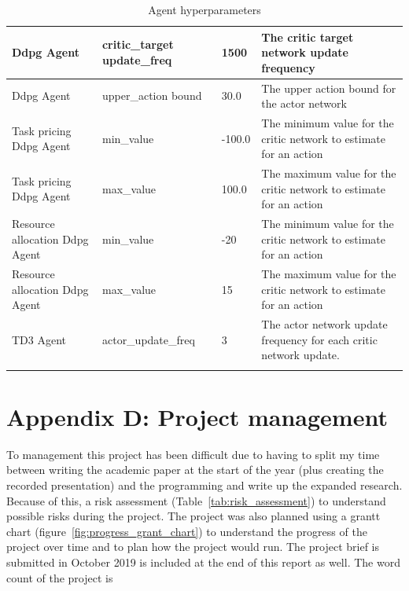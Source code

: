 \begin{longtable}{|p{2cm}|p{3.5cm}|p{2.5cm}|p{6cm}|}
        Ddpg Agent & critic\_target update\_freq & 1500 & The critic target network update frequency \\ \hline
        Ddpg Agent & upper\_action bound & 30.0 & The upper action bound for the actor network \\ \hline
        Task pricing Ddpg Agent & min\_value & -100.0 & The minimum value for the critic network to estimate for an
            action \\ \hline
        Task pricing Ddpg Agent & max\_value & 100.0 & The maximum value for the critic network to estimate for an
            action\\ \hline
        Resource allocation Ddpg Agent & min\_value & -20 & The minimum value for the critic network to estimate for an
            action \\ \hline
        Resource allocation Ddpg Agent & max\_value & 15 & The maximum value for the critic network to estimate for an
            action\\ \hline
        TD3 Agent & actor\_update\_freq & 3 & The actor network update frequency for each critic network update. \\ \hline
    \caption{Agent hyperparameters}
    \label{tab:agent_hyperparameters}
\end{longtable}

\section*{Appendix D: Project management} \label{app:project-management}
To management this project has been difficult due to having to split my time between writing the academic paper at the
start of the year (plus creating the recorded presentation) and the programming and write up the expanded research.
Because of this, a risk assessment (Table~\ref{tab:risk_assessment}) to understand possible risks during the project.
The project was also planned using a grantt chart (figure~\ref{fig:progress_grant_chart}) to understand the progress of
the project over time and to plan how the project would run. The project brief is submitted in October 2019
is included at the end of this report as well. The word count of the project is

